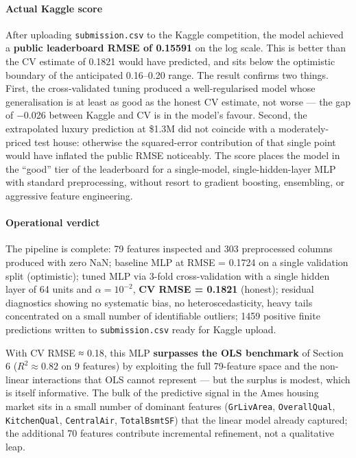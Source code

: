 \paragraph{Actual Kaggle score}\label{actual-kaggle-score}

After uploading \texttt{submission.csv} to the Kaggle competition, the
model achieved a \textbf{public leaderboard RMSE of 0.15591} on the log
scale. This is better than the CV estimate of 0.1821 would have
predicted, and sits below the optimistic boundary of the anticipated
0.16--0.20 range. The result confirms two things. First, the
cross-validated tuning produced a well-regularised model whose
generalisation is at least as good as the honest CV estimate, not worse
--- the gap of −0.026 between Kaggle and CV is in the model's favour.
Second, the extrapolated luxury prediction at \$1.3M did not coincide
with a moderately-priced test house: otherwise the squared-error
contribution of that single point would have inflated the public RMSE
noticeably. The score places the model in the ``good'' tier of the
leaderboard for a single-model, single-hidden-layer MLP with standard
preprocessing, without resort to gradient boosting, ensembling, or
aggressive feature engineering.

\paragraph{Operational verdict}\label{operational-verdict-3}

The pipeline is complete: 79 features inspected and 303 preprocessed
columns produced with zero NaN; baseline MLP at RMSE = 0.1724 on a
single validation split (optimistic); tuned MLP via 3-fold
cross-validation with a single hidden layer of 64 units and
\(\alpha = 10^{-2}\), \textbf{CV RMSE = 0.1821} (honest); residual
diagnostics showing no systematic bias, no heteroscedasticity, heavy
tails concentrated on a small number of identifiable outliers; 1459
positive finite predictions written to \texttt{submission.csv} ready for
Kaggle upload.

With CV RMSE ≈ 0.18, this MLP \textbf{surpasses the OLS benchmark} of
Section 6 (\(R^2 \approx 0.82\) on 9 features) by exploiting the full
79-feature space and the non-linear interactions that OLS cannot
represent --- but the surplus is modest, which is itself informative.
The bulk of the predictive signal in the Ames housing market sits in a
small number of dominant features (\texttt{GrLivArea},
\texttt{OverallQual}, \texttt{KitchenQual}, \texttt{CentralAir},
\texttt{TotalBsmtSF}) that the linear model already captured; the
additional 70 features contribute incremental refinement, not a
qualitative leap.

